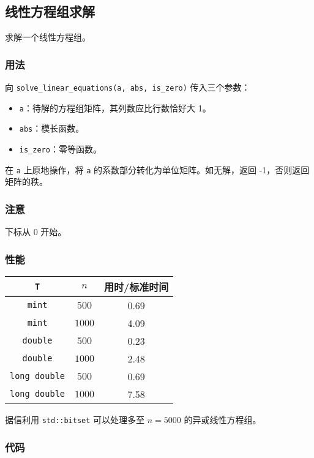 \subsection{线性方程组求解}

求解一个线性方程组。

\subsubsection{用法}

向 \lstinline{solve_linear_equations(a, abs, is_zero)} 传入三个参数：
\begin{itemize}
\item \lstinline{a}：待解的方程组矩阵，其列数应比行数恰好大 1。
\item \lstinline{abs}：模长函数。
\item \lstinline{is_zero}：零等函数。
\end{itemize}

在 \lstinline{a} 上原地操作，将 \lstinline{a} 的系数部分转化为单位矩阵。如无解，返回 -1，否则返回矩阵的秩。

\subsubsection{注意}

下标从 0 开始。

\subsubsection{性能}

\begin{tabular}{|c|c|c|}
\hline
\lstinline|T| & $n$ & 用时/标准时间 \\
\hline
\lstinline|mint| & $500$ & 0.69 \\
\hline
\lstinline|mint| & $1000$ & 4.09 \\
\hline
\lstinline|double| & $500$ & 0.23 \\
\hline
\lstinline|double| & $1000$ & 2.48 \\
\hline
\lstinline|long double| & $500$ & 0.69 \\
\hline
\lstinline|long double| & $1000$ & 7.58 \\
\hline
\end{tabular}

据信利用 \lstinline{std::bitset} 可以处理多至 $n = 5000$ 的异或线性方程组。

\subsubsection{代码}


